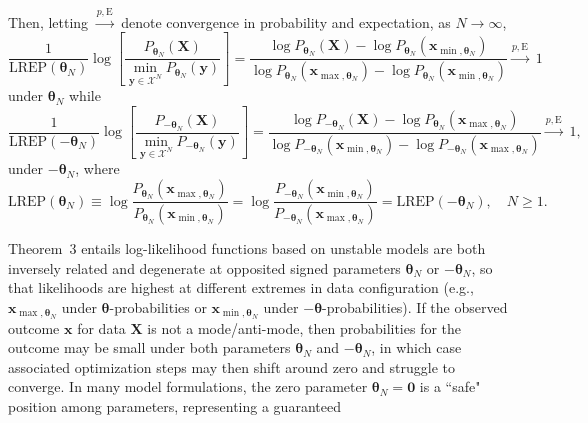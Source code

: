 \documentclass[12pt]{article}
\theoremstyle{definition}
\newcommand{\REP}{\mathrm{LREP}}
\begin{document}
{\begin{theorem1}
{Then, letting $\stackrel{\mbox{$p, \mathrm{E}$}}{\longrightarrow}$ denote  convergence in  probability  and expectation,
 as $N\to \infty$,
 \[
    \frac{1}{\REP(\boldsymbol \theta_N)} \log\left[ \frac{P_{\boldsymbol \theta_N }(\boldsymbol X) }{ \displaystyle{\min_{\boldsymbol y\in\mathcal{X}^N}} P_{\boldsymbol \theta_N }(\boldsymbol y)}\right] = \frac{ \log P_{\boldsymbol \theta_N } ( \boldsymbol X)  - \log P_{\boldsymbol \theta_N }(\boldsymbol{x}_{\min, \boldsymbol \theta_N}) }
    { \log P_{\boldsymbol \theta_N } (\boldsymbol{x}_{\max, \boldsymbol \theta_N})  - \log P_{\boldsymbol \theta_N }(\boldsymbol{x}_{\min, \boldsymbol \theta_N}) }
 \stackrel{\mbox{$p, \mathrm{E}$}}{\longrightarrow}
 \; 1
\]
  under $\boldsymbol\theta_N$ while
\[
 \frac{1}{\REP(-\boldsymbol \theta_N)} \log\left[ \frac{P_{-\boldsymbol \theta_N }(\boldsymbol X) }{  \displaystyle{\min_{\boldsymbol y\in\mathcal{X}^N}} P_{-\boldsymbol \theta_N }(\boldsymbol y)} \right]
 =    \frac{ \log P_{-\boldsymbol \theta_N } ( \boldsymbol X) - \log P_{ \boldsymbol \theta_N }(\boldsymbol{x}_{\max, \boldsymbol \theta_N})    }
     { \log P_{-\boldsymbol \theta_N } (\boldsymbol{x}_{\min, \boldsymbol \theta_N})  - \log P_{-\boldsymbol \theta_N }(\boldsymbol{x}_{\max, \boldsymbol \theta_N}) }
 \stackrel{\mbox{$p,\mathrm{E}$}}{\longrightarrow}
 \; 1,
\]
 under $-\boldsymbol\theta_N$, where
 \[
 \REP( \boldsymbol \theta_N) \equiv \log \frac{P_{\boldsymbol \theta_N } (\boldsymbol{x}_{\max, \boldsymbol \theta_N})}{P_{\boldsymbol \theta_N }(\boldsymbol{x}_{\min, \boldsymbol \theta_N})} = \log  \frac{P_{-\boldsymbol \theta_N } (\boldsymbol{x}_{\min, \boldsymbol \theta_N}) }{ P_{-\boldsymbol \theta_N }(\boldsymbol{x}_{\max, \boldsymbol \theta_N})}=   \REP( -\boldsymbol \theta_N), \quad N \geq 1.
  \]
 }
\end{theorem1}
 Theorem~3 entails
log-likelihood functions  based on unstable models  are both inversely related and degenerate at opposited signed parameters $ \boldsymbol \theta_N$ or $-\boldsymbol \theta_N$, so that  likelihoods are highest  at different extremes in data configuration (e.g., $\boldsymbol{x}_{\max, \boldsymbol \theta_N}$ under
$\boldsymbol \theta$-probabilities or  $\boldsymbol{x}_{\min, \boldsymbol \theta_N}$ under
$-\boldsymbol \theta$-probabilities).  If the observed outcome $\boldsymbol x$ for data $\boldsymbol X$ is not a mode/anti-mode, then probabilities for the outcome may be small under both  parameters $ \boldsymbol \theta_N$ and $-\boldsymbol \theta_N$, in which case
  associated optimization steps may then shift around zero and struggle to converge.  In many model formulations, the zero parameter $ \boldsymbol \theta_N=\boldsymbol 0$ is a ``safe" position among parameters, representing a  guaranteed
}
\end{document}
